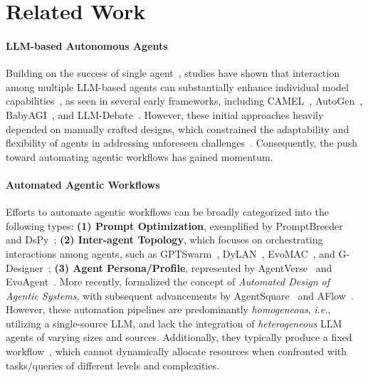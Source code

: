 \section{Related Work}
\vspace{-0.5em}
\paragraph{LLM-based Autonomous Agents}
Building on the success of single agent~\citep{shen2024hugginggpt,zhu2024knowagent,zhong2024memorybank}, studies have shown that interaction among multiple LLM-based agents can substantially enhance individual model capabilities~\citep{FCS2024_Survey-Agent}, as seen in several early frameworks, including CAMEL~\citep{NeurIPS2023camel}, AutoGen~\citep{autogen}, BabyAGI~\citep{babyagi}, and LLM-Debate~\citep{arXiv2023_MultiAgent-Debate}. However, these initial approaches heavily depended on manually crafted designs, which constrained the adaptability and flexibility of agents in addressing unforeseen challenges~\citep{he2023lego,chen2023agentverse}. Consequently, the push toward automating agentic workflows has gained momentum.

\vspace{-0.7em}
\paragraph{Automated Agentic Workflows}
Efforts to automate agentic workflows can be broadly categorized into the following types: \textbf{(1) Prompt Optimization}, exemplified by PromptBreeder~\citep{fernando2023promptbreeder} and DsPy~\citep{khattab2023dspy}; \textbf{(2) Inter-agent Topology}, which focuses on orchestrating interactions among agents, such as GPTSwarm~\citep{zhuge2024gptswarm}, DyLAN~\citep{arXiv2023_Dynamic-LLM-Agent}, EvoMAC~\citep{hu2024evomac}, and G-Designer~\citep{zhang2024gdesigner}; \textbf{(3) Agent Persona/Profile}, represented by AgentVerse~\citep{chen2023agentverse} and EvoAgent~\citep{yuan2024evoagent}. More recently, \citet{hu2024adas} formalized the concept of \textit{Automated Design of Agentic Systems}, with subsequent advancements by AgentSquare~\citep{shang2024agentsquare} and AFlow~\citep{zhang2024aflow}. However, these automation pipelines are predominantly \textit{homogeneous}, \textit{i.e.}, utilizing a single-source LLM, and lack the integration of \textit{heterogeneous} LLM agents of varying sizes and sources. Additionally, they typically produce a fixed workflow~\citep{yuan2024evoagent,zhuge2024gptswarm,zhang2024aflow}, which cannot dynamically allocate resources when confronted with tasks/queries of different levels and complexities.

